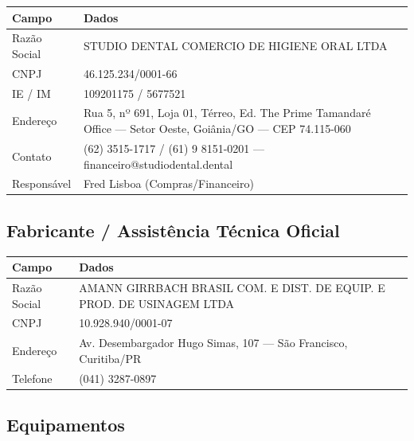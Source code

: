 \documentclass[12pt, a4paper]{article}
\begin{document}
\begin{table}[H]
    \centering
    \renewcommand{\arraystretch}{1.4}
    \begin{tabularx}{\textwidth}{@{} l X @{}}
        \toprule
        \rowcolor{tableHeader} \textbf{Campo} & \textbf{Dados} \\
        \midrule
        Razão Social & STUDIO DENTAL COMERCIO DE HIGIENE ORAL LTDA \\
        \rowcolor{lightGray}
        CNPJ & 46.125.234/0001-66 \\
        IE / IM & 109201175 / 5677521 \\
        \rowcolor{lightGray}
        Endereço & Rua 5, nº 691, Loja 01, Térreo, Ed. The Prime Tamandaré Office --- Setor Oeste, Goiânia/GO --- CEP 74.115-060 \\
        Contato & (62) 3515-1717 / (61) 9 8151-0201 --- financeiro@studiodental.dental \\
        \rowcolor{lightGray}
        Responsável & Fred Lisboa (Compras/Financeiro) \\
        \bottomrule
    \end{tabularx}
\end{table}

\subsection{Fabricante / Assistência Técnica Oficial}

\begin{table}[H]
    \centering
    \renewcommand{\arraystretch}{1.4}
    \begin{tabularx}{\textwidth}{@{} l X @{}}
        \toprule
        \rowcolor{tableHeader} \textbf{Campo} & \textbf{Dados} \\
        \midrule
        Razão Social & AMANN GIRRBACH BRASIL COM. E DIST. DE EQUIP. E PROD. DE USINAGEM LTDA \\
        \rowcolor{lightGray}
        CNPJ & 10.928.940/0001-07 \\
        Endereço & Av. Desembargador Hugo Simas, 107 --- São Francisco, Curitiba/PR \\
        \rowcolor{lightGray}
        Telefone & (041) 3287-0897 \\
        \bottomrule
    \end{tabularx}
\end{table}

\pagebreak
\subsection{Equipamentos}
\end{document}
